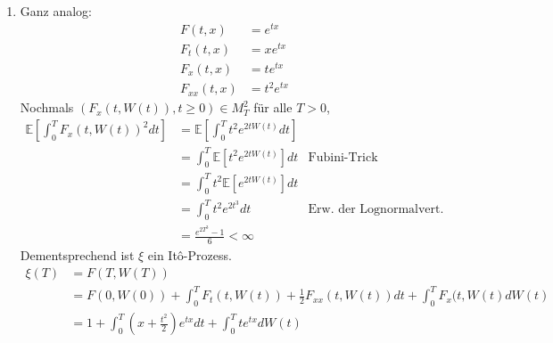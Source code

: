 \documentclass[a4paper,11pt,notitlepage,fullpage]{article}
\newcommand{\Ee}[1]{\mathbb E\left[#1\right]}
\begin{document}
\begin{enumerate}
\item Ganz analog:
\begin{align*}
F(t, x) &= e^{tx} \\
F_t(t, x) &= x e^{tx} \\
F_x(t, x) &= t e^{tx} \\
F_{xx}(t, x) &= t^2 e^{tx}
\end{align*}
Nochmals $(F_x(t, W(t)), t \geq 0) \in M_T^2$ für alle $T > 0$, 
\begin{align*}
\Ee{ \int_0^T F_x(t, W(t))^2 dt} &= \Ee{ \int_0^T t^2 e^{2tW(t)} dt} \\
&= \int_0^T \Ee{ t^2 e^{2tW(t)}} dt &\text{Fubini-Trick} \\
&= \int_0^T  t^2 \Ee{ e^{2tW(t)}} dt \\
&= \int_0^T  t^2 e^{2t^3} dt &\text{Erw. der Lognormalvert.}\\
&= \frac{e^{2T^3} - 1}{6} < \infty
\end{align*}
Dementsprechend ist $\xi$ ein Itô-Prozess.
\begin{align*}
\xi(T) &= F(T, W(T)) \\
&= F(0, W(0)) + \int_0^T F_t(t, W(t)) + \frac{1}{2} F_{xx}(t, W(t)) dt + \int_0^T F_x(t, W(t) dW(t) \\
&= 1 + \int_0^T (x + \frac{t^2}{2}) e^{tx} dt + \int_0^T t e^{tx} dW(t)
\end{align*}


\end{enumerate}
\end{document}
